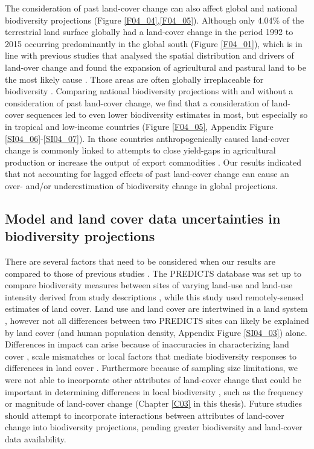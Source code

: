 The consideration of past land-cover change can also affect global and national biodiversity projections (Figure \ref{F04_04},\ref{F04_05}). Although only 4.04\% of the terrestrial land surface globally had a land-cover change in the period 1992 to 2015 occurring predominantly in the global south (Figure \ref{F04_01}), which is in line with previous studies that analysed the spatial distribution and drivers of land-over change \citep{Curtis2018,Nowosad2018} and found the expansion of agricultural and pastural land to be the most likely cause \citep{Phalan2013}. Those areas are often globally irreplaceable for biodiversity \citep{Brooks2002,Laurance2014b,Pimm2014}. Comparing national biodiversity projections with and without a consideration of past land-cover change, we find that a consideration of land-cover sequences led to even lower biodiversity estimates in most, but especially so in tropical and low-income countries (Figure \ref{F04_05}, Appendix Figure \ref{SI04_06}-\ref{SI04_07}). In those countries anthropogenically caused land-cover change is commonly linked to attempts to close yield-gaps in agricultural production \citep{Mueller2012a} or increase the output of export commodities \citep{Byerlee2014,Meyfroidt2018}. Our results indicated that not accounting for lagged effects of past land-cover change can cause an over- and/or underestimation of biodiversity change in global projections.

\subsection{Model and land cover data uncertainties in biodiversity projections}
\label{C04_0402}

There are several factors that need to be considered when our results are compared to those of previous studies \citep{Newbold2015}. The PREDICTS database was set up to compare biodiversity measures between sites of varying land-use and land-use intensity derived from study descriptions \citep{Newbold2015,Hudson2016}, while this study used remotely-sensed estimates of land cover. Land use and land cover are intertwined in a land system \citep{Lambin2006,Turner2007}, however not all differences between two PREDICTS sites can likely be explained by land cover (and human population density, Appendix Figure \ref{SI04_03}) alone. Differences in impact can arise because of inaccuracies in characterizing land cover \citep{ESA2017}, scale mismatches \citep{Estes2018} or local factors that mediate biodiversity responses to differences in land cover \citep{Jung2016}. Furthermore because of sampling size limitations, we were not able to incorporate other attributes of land-cover change that could be important in determining differences in local biodiversity \citep{Watson2014}, such as the frequency \citep{Watson2014,Griffiths2015} or magnitude of land-cover change (Chapter \ref{C03} in this thesis). Future studies should attempt to incorporate interactions between attributes of land-cover change into biodiversity projections, pending greater biodiversity and land-cover data availability.

